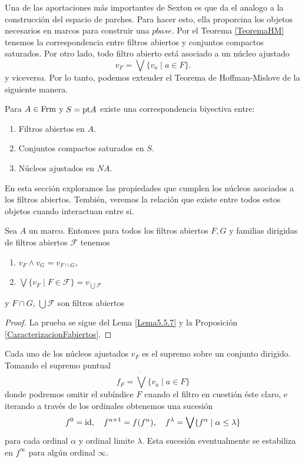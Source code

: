 Una de las aportaciones más importantes de Sexton es que da el analogo a la construcción del espacio de parches. Para hacer esto, 
ella proporcina los objetos necesarios en marcos para construir una $pbase$. Por el Teorema \ref{TeoremaHM} tenemos la correspondencia 
entre filtros abiertos y conjuntos compactos saturados. Por otro lado, todo filtro abierto está asociado a un núcleo ajustado  
\[
v_F=\bigvee\{v_a\mid a\in F\}.
\]
y viceversa. Por lo tanto, podemos extender el Teorema de Hoffman-Mislove de la siguiente manera.
\begin{thm}\label{HM extendido}
Para $A\in \mathrm{Frm}$ y $S=\mathrm{pt} A$ existe una correspondencia biyectiva entre: 
\begin{enumerate}[$i) $]
    \item Filtros abiertos en $A$.
    \item Conjuntos compactos saturados en $S$.
    \item Núcleos ajustados en $NA$.
\end{enumerate}
\end{thm}

En esta sección exploramos las propiedades que cumplen los núcleos asociados a los filtros abiertos. Tembién, veremos la relación que 
existe entre todos estos objetos cuando interactuan entre si.

\begin{lem}
    Sea $A$ un marco. Entonces para todos los filtros abiertos $F, G$ y familias dirigidas de filtros abiertos $\mathcal{F}$ tenemos
    \begin{enumerate}[$i) $]
        \item $v_F\wedge v_G=v_{F\cap G}$,
        \item $\bigvee\{v_F\mid F\in \mathcal{F}\}=v_{\bigcup \mathcal{F}}$
    \end{enumerate}
    y $F\cap G$, $\bigcup \mathcal{F}$ son filtros abiertos
\end{lem}

\begin{proof}
    La prueba se sigue del Lema \ref{Lema5.5.7} y la Proposición \ref{CaracterizacionFabiertos}.
\end{proof}

Cada uno de los núcleos ajustados $v_F$ es el supremo sobre un conjunto dirigido. Tomando el supremo puntual
\[
f_F=\dot{\bigvee}\{v_a\mid a\in F\}
\]
donde podremos omitir el subíndice $F$ cuando el filtro en cuestión éste claro, e iterando a través de los ordinales obtenemos una sucesión 
\[
f^0=\mathrm{id},\quad f^{\alpha+1}=f(f^\alpha), \quad f^\lambda=\bigvee\{f^\alpha\mid \alpha \leq \lambda\}
\]
para cada ordinal $\alpha$ y ordinal limite $\lambda$. Esta sucesión eventualmente se estabiliza en $f^\infty$ para algún ordinal $\infty$.\\

